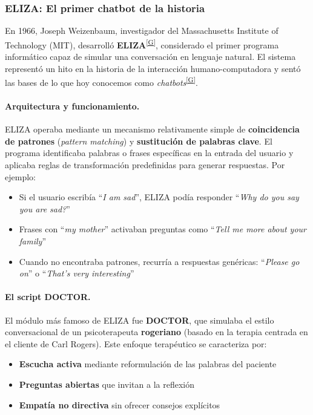 \documentclass[12pt,a4paper]{report}
\numberwithin{figure}{section}
\begin{document}
\subsubsection{ELIZA: El primer chatbot de la historia}
\label{subsubsec:eliza}

En 1966, Joseph Weizenbaum, investigador del Massachusetts Institute of Technology (MIT), desarrolló \textbf{ELIZA}\textsuperscript{\hyperref[glos:eliza]{[G]}}, considerado el primer programa informático capaz de simular una conversación en lenguaje natural. El sistema representó un hito en la historia de la interacción humano-computadora y sentó las bases de lo que hoy conocemos como \textit{chatbots}\textsuperscript{\hyperref[glos:chatbot]{[G]}}.

\paragraph{Arquitectura y funcionamiento.}
ELIZA operaba mediante un mecanismo relativamente simple de \textbf{coincidencia de patrones} (\textit{pattern matching}) y \textbf{sustitución de palabras clave}. El programa identificaba palabras o frases específicas en la entrada del usuario y aplicaba reglas de transformación predefinidas para generar respuestas. Por ejemplo:
\begin{itemize}
    \item Si el usuario escribía ``\textit{I am sad}'', ELIZA podía responder ``\textit{Why do you say you are sad?}''
    \item Frases con ``\textit{my mother}'' activaban preguntas como ``\textit{Tell me more about your family}''
    \item Cuando no encontraba patrones, recurría a respuestas genéricas: ``\textit{Please go on}'' o ``\textit{That's very interesting}''
\end{itemize}

\paragraph{El script DOCTOR.}
El módulo más famoso de ELIZA fue \textbf{DOCTOR}, que simulaba el estilo conversacional de un psicoterapeuta \textbf{rogeriano} (basado en la terapia centrada en el cliente de Carl Rogers). Este enfoque terapéutico se caracteriza por:
\begin{itemize}
    \item \textbf{Escucha activa} mediante reformulación de las palabras del paciente
    \item \textbf{Preguntas abiertas} que invitan a la reflexión
    \item \textbf{Empatía no directiva} sin ofrecer consejos explícitos
\end{itemize}
\end{document}
